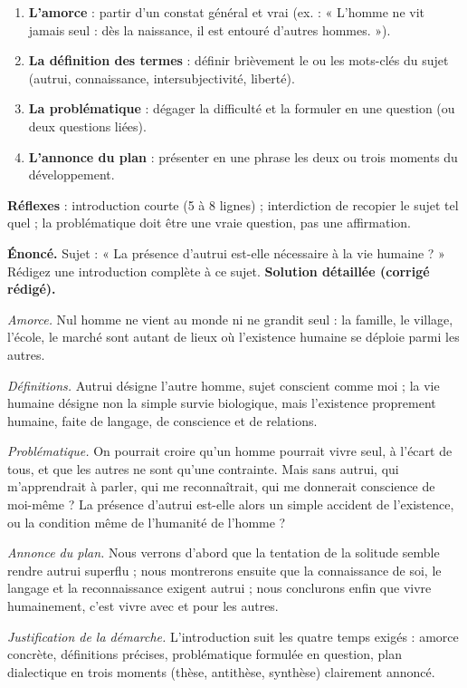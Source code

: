 \documentclass[11pt]{article}
\begin{document}
\begin{methode}
\begin{enumerate}
\item \textbf{L'amorce} : partir d'un constat général et vrai (ex. : « L'homme ne vit jamais seul : dès la naissance, il est entouré d'autres hommes. »).
\item \textbf{La définition des termes} : définir brièvement le ou les mots-clés du sujet (autrui, connaissance, intersubjectivité, liberté).
\item \textbf{La problématique} : dégager la difficulté et la formuler en une question (ou deux questions liées).
\item \textbf{L'annonce du plan} : présenter en une phrase les deux ou trois moments du développement.
\end{enumerate}
\textbf{Réflexes} : introduction courte (5 à 8 lignes) ; interdiction de recopier le sujet tel quel ; la problématique doit être une vraie question, pas une affirmation.
\end{methode}

\begin{exoresolu}
\textbf{Énoncé.} Sujet : « La présence d'autrui est-elle nécessaire à la vie humaine ? » Rédigez une introduction complète à ce sujet.
\tcblower
\textbf{Solution détaillée (corrigé rédigé).}

\emph{Amorce.} Nul homme ne vient au monde ni ne grandit seul : la famille, le village, l'école, le marché sont autant de lieux où l'existence humaine se déploie parmi les autres.

\emph{Définitions.} Autrui désigne l'autre homme, sujet conscient comme moi ; la vie humaine désigne non la simple survie biologique, mais l'existence proprement humaine, faite de langage, de conscience et de relations.

\emph{Problématique.} On pourrait croire qu'un homme pourrait vivre seul, à l'écart de tous, et que les autres ne sont qu'une contrainte. Mais sans autrui, qui m'apprendrait à parler, qui me reconnaîtrait, qui me donnerait conscience de moi-même ? La présence d'autrui est-elle alors un simple accident de l'existence, ou la condition même de l'humanité de l'homme ?

\emph{Annonce du plan.} Nous verrons d'abord que la tentation de la solitude semble rendre autrui superflu ; nous montrerons ensuite que la connaissance de soi, le langage et la reconnaissance exigent autrui ; nous conclurons enfin que vivre humainement, c'est vivre avec et pour les autres.

\emph{Justification de la démarche.} L'introduction suit les quatre temps exigés : amorce concrète, définitions précises, problématique formulée en question, plan dialectique en trois moments (thèse, antithèse, synthèse) clairement annoncé.
\end{exoresolu}
\end{document}
